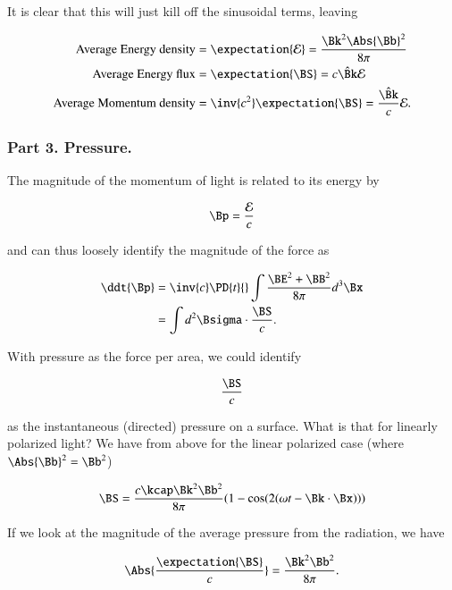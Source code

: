It is clear that this will just kill off the sinusoidal terms, leaving

\begin{align}\label{eqn:relElectroDynProblemSet4:350b}
\mbox{Average Energy density} &= \expectation{\mathcal{E}} = \frac{ \Bk^2 \Abs{\Bb}^2 }{8\pi} \\
\mbox{Average Energy flux} &= \expectation{\BS} = c \hat{\Bk} \mathcal{E} \\
\mbox{Average Momentum density} &= \inv{c^2} \expectation{\BS} = \frac{\hat{\Bk}}{c} \mathcal{E}.
\end{align}

\subsubsection{Part 3.  Pressure.}

The magnitude of the momentum of light is related to its energy by

\begin{equation}\label{eqn:relElectroDynProblemSet4:351}
\Bp = \frac{\mathcal{E}}{c}
\end{equation}

and can thus loosely identify the magnitude of the force as 

\begin{align*}
\ddt{\Bp} 
&= \inv{c} \PD{t}{} \int \frac{\BE^2 + \BB^2}{8 \pi} d^3 \Bx \\
&= \int d^2 \Bsigma \cdot \frac{\BS}{c}.
\end{align*}

With pressure as the force per area, we could identify 

\begin{equation}\label{eqn:relElectroDynProblemSet4:252}
\frac{\BS}{c}
\end{equation}

as the instantaneous (directed) pressure on a surface.  What is that for linearly polarized light?  We have from above for the linear polarized case (where $\Abs{\Bb}^2 = \Bb^2$)

\begin{equation}\label{eqn:relElectroDynProblemSet4:353}
\BS = \frac{c \kcap \Bk^2 \Bb^2 }{8 \pi} ( 1 - \cos( 2 (\omega t - \Bk \cdot \Bx) ) )
\end{equation}

If we look at the magnitude of the average pressure from the radiation, we have

\begin{equation}\label{eqn:relElectroDynProblemSet4:354}
\Abs{\frac{\expectation{\BS}}{c}} = \frac{\Bk^2 \Bb^2 }{8 \pi}.
\end{equation}


